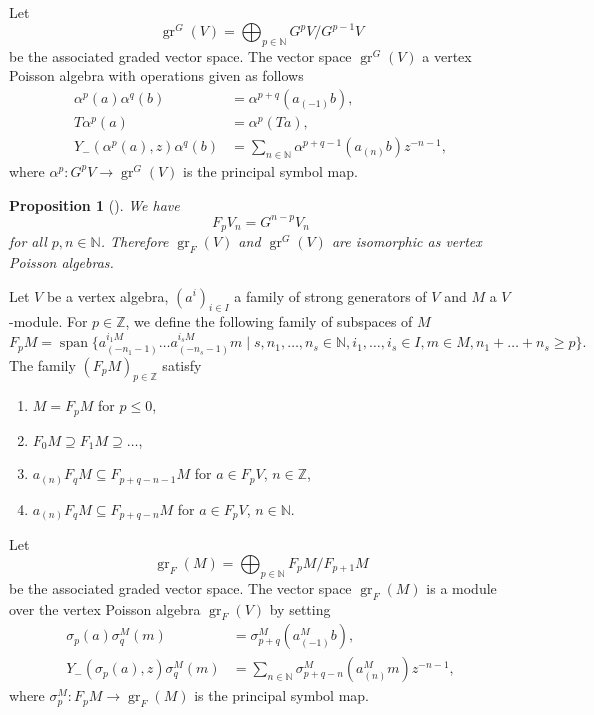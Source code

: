 \documentclass[12pt, a4paper]{article}
\newtheorem{proposition}{Proposition}
\DeclareMathOperator{\gr}{gr}
\DeclareMathOperator{\vspan}{span}
\begin{document}
Let
\begin{equation*}
  \gr^G(V)=\bigoplus_{p\in\mathbb{N}}G^pV/G^{p-1}V
\end{equation*}
be the associated graded vector space.
The vector space $\gr^G(V)$ a vertex Poisson algebra with operations given as follows
\begin{align*}
  \alpha^p(a)\alpha^q(b) &= \alpha^{p + q}(a_{(-1)}b), \\
  T\alpha^p(a) &= \alpha^p(Ta), \\
  Y_-(\alpha^p(a), z)\alpha^q(b) &= \sum_{n \in \mathbb{N}}\alpha^{p + q - 1}(a_{(n)}b)z^{-n - 1},
\end{align*}
where $\alpha^p: G^pV \to \gr^G(V)$ is the principal symbol map.

\begin{proposition}[{\cite[Proposition 2.6.1]{arakawa_remark_2012}}]
  \label{prp:3}
  We have
  \begin{equation*}
    F_pV_n = G^{n - p}V_n
  \end{equation*}
  for all $p, n \in \mathbb{N}$.
  Therefore $\gr_F(V)$ and $\gr^G(V)$ are isomorphic as vertex Poisson algebras.
\end{proposition}

Let $V$ be a vertex algebra, $(a^i)_{i \in I}$ a family of strong generators of $V$ and $M$ a $V$-module.
For $p\in \mathbb{Z}$, we define the following family of subspaces of $M$
\begin{equation*}
  F_pM = \vspan \{a^{i_1M}_{(-n_1 - 1)}\dots a^{i_sM}_{(-n_s - 1)}m \mid s, n_1, \dots, n_s \in \mathbb{N}, i_1, \dots, i_s \in I, m \in M, n_1 + \dots + n_s \ge p\}.
\end{equation*}
The family $(F_pM)_{p \in \mathbb{Z}}$ satisfy
\begin{enumerate}[label={(\alph*)}]
\item $M = F_pM$ for $p \le 0$,
\item $F_0M \supseteq F_1M \supseteq \dots$,
\item $a_{(n)}F_qM \subseteq F_{p + q - n - 1}M$ for $a \in F_pV$, $n \in \mathbb{Z}$,
\item $a_{(n)}F_qM \subseteq F_{p + q - n}M$ for $a \in F_pV$, $n \in \mathbb{N}$.
\end{enumerate}

Let
\begin{equation*}
  \gr_F(M) = \bigoplus_{p\in \mathbb{N}}F_pM/F_{p + 1}M
\end{equation*}
be the associated graded vector space.
The vector space $\gr_F(M)$ is a module over the vertex Poisson algebra $\gr_F(V)$ by setting
\begin{align*}
  \sigma_p(a)\sigma^M_q(m) &= \sigma^M_{p + q}(a^M_{(-1)}b), \\
  Y_-(\sigma_p(a), z)\sigma^M_q(m) &= \sum_{n \in \mathbb{N}}\sigma^M_{p + q - n}(a^M_{(n)}m)z^{-n - 1},
\end{align*}
where $\sigma^M_p: F_pM \to \gr_F(M)$ is the principal symbol map.
\end{document}
